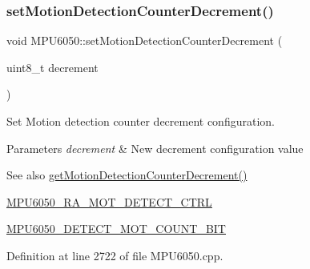\begin{DoxyCode}{0}

\end{DoxyCode}
\mbox{\label{classMPU6050_a74cc3ea727afa5d4406175085e60d08c}} 
\subsubsection{\texorpdfstring{setMotionDetectionCounterDecrement()}{setMotionDetectionCounterDecrement()}}
{\footnotesize\ttfamily void M\+P\+U6050\+::set\+Motion\+Detection\+Counter\+Decrement (\begin{DoxyParamCaption}\item[{uint8\+\_\+t}]{decrement }\end{DoxyParamCaption})}

Set Motion detection counter decrement configuration. 
\begin{DoxyParams}{Parameters}
{\em decrement} & New decrement configuration value \\
\hline
\end{DoxyParams}
\begin{DoxySeeAlso}{See also}
\mbox{\hyperlink{classMPU6050_a0ed8de8eb440dbfdec829297527b0da6}{get\+Motion\+Detection\+Counter\+Decrement()}} 

\mbox{\hyperlink{MPU6050_8h_ae83e3eb48f0803227db54291fdf0ea80}{M\+P\+U6050\+\_\+\+R\+A\+\_\+\+M\+O\+T\+\_\+\+D\+E\+T\+E\+C\+T\+\_\+\+C\+T\+RL}} 

\mbox{\hyperlink{MPU6050_8h_a43d8fcac0f570c3333ef3236764c8315}{M\+P\+U6050\+\_\+\+D\+E\+T\+E\+C\+T\+\_\+\+M\+O\+T\+\_\+\+C\+O\+U\+N\+T\+\_\+\+B\+IT}} 
\end{DoxySeeAlso}


Definition at line 2722 of file M\+P\+U6050.\+cpp.


